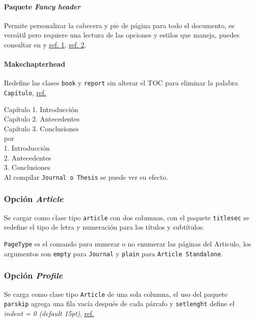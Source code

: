 \paragraph{Paquete \textit{Fancy header}}
Permite personalizar la cabecera y pie de página para todo el documento, es versátil pero requiere una lectura de las opciones y estilos que maneja, puedes consultar en \cite{Oetiker2014} y \href{http://www.sharelatex.com/learn/Management_in_a_large_project}{ref. 1}, \href{http://en.wikibooks.org/wiki/LaTeX/Page_Layout#Customizing_with_fancyhdr}{ref. 2}.

\paragraph{Makechapterhead}
Redefine las clases \verb|book| y \verb|report| sin alterar el TOC para eliminar la palabra \verb|Capítulo|, \href{http://tex.stackexchange.com/questions/62516/how-to-suppress-chapter-in-chapter-while-keeping-numbering/62527#62527}{ref.}

Capítulo 1. Introducción\\
Capítulo 2. Antecedentes\\
Capítulo 3. Conclusiones\\
por\\
1. Introducción\\
2. Antecedentes\\
3. Conclusiones\\

Al compilar \verb|Journal o Thesis| se puede ver su efecto.

\subsubsection{Opción \textit{Article}}
Se cargar como clase tipo \verb|article| con dos columnas, con el paquete \verb|titlesec| se redefine el tipo de letra y numeración para los títulos y subtítulos.

\verb|PageType| es el comando para numerar o no enumerar las páginas del Articulo, los argumentos son \verb|empty| para \verb|Journal| y \verb|plain| para \verb|Article Standalone|.



\subsubsection{Opción \textit{Profile}}
Se carga como clase tipo \verb|Article| de una sola columna, el uso del paquete \verb|parskip| agrega una fila vacía después de cada párrafo y \verb|setlenght| define el \textit{indent = 0 (default 15pt)}, \href{http://en.wikibooks.org/wiki/LaTeX/Paragraph_Formatting}{ref.}

